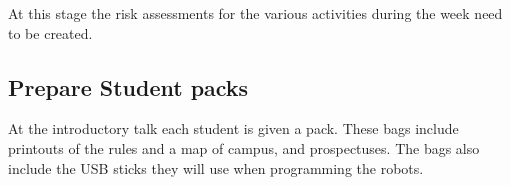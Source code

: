At this stage the risk assessments for the various activities during the week need to be created.


\subsection{Prepare Student packs}

At the introductory talk each student is given a pack.
These bags include printouts of the rules and a map of campus, and prospectuses.
The bags also include the USB sticks they will use when programming the robots.

